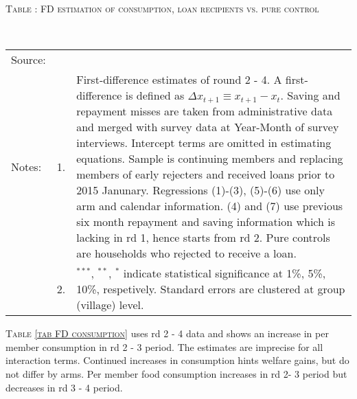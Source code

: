 \hspace{-1cm}\begin{minipage}[t]{14cm}
\hfil\textsc{\normalsize Table \thetable: FD estimation of consumption, loan recipients vs. pure control\label{tab FD consumption pure control}}\\
\setlength{\tabcolsep}{1pt}
\setlength{\baselineskip}{8pt}
\renewcommand{\arraystretch}{.55}
\hfil{}\\
\renewcommand{\arraystretch}{.8}
\setlength{\tabcolsep}{1pt}
\begin{tabular}{>{\hfill\scriptsize}p{1cm}<{}>{\hfill\scriptsize}p{.25cm}<{}>{\scriptsize}p{12cm}<{\hfill}}
Source:& \multicolumn{2}{l}{\scriptsize Estimated with GUK administrative and survey data.}\\
Notes: & 1. & First-difference estimates of round 2 - 4. A first-difference is defined as $\Delta x_{t+1}\equiv x_{t+1} - x_{t}$. Saving and repayment misses are taken from administrative data and merged with survey data at Year-Month of survey interviews. Intercept terms are omitted in estimating equations. Sample is continuing members and replacing members of early rejecters and received loans prior to 2015 Janunary. Regressions (1)-(3), (5)-(6) use only arm and calendar information. (4) and (7) use previous six month repayment and saving information which is lacking in rd 1, hence starts from rd 2. Pure controls are households who rejected to receive a loan.\\
& 2. & ${}^{***}$, ${}^{**}$, ${}^{*}$ indicate statistical significance at 1\%, 5\%, 10\%, respetively. Standard errors are clustered at group (village) level.
\end{tabular}
\end{minipage}


\begin{palepinkleftbar}
\begin{finding}
\textsc{\small Table \ref{tab FD consumption}} uses rd 2 - 4 data and shows an increase in per member consumption in rd 2 - 3 period. The estimates are imprecise for all interaction terms. Continued increases in consumption hints welfare gains, but do not differ by arms. Per member food consumption increases in rd 2- 3 period but decreases in rd 3 - 4 period.
\end{finding}
\end{palepinkleftbar}


